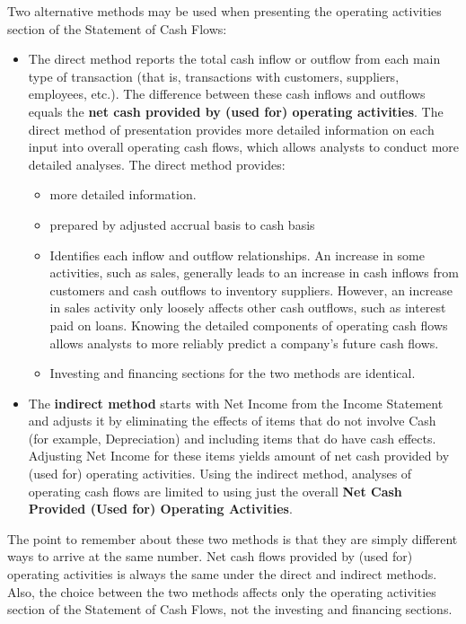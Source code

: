 \documentclass[../main.tex]{subfiles}
\begin{document}
	Two alternative methods may be used when presenting the operating 
	activities section of the Statement of Cash Flows:
	\begin{itemize}[noitemsep]
		\item The direct method reports the total cash inflow or outflow from 
		each main type of transaction (that is, transactions with customers, 
		suppliers, employees, etc.). The difference between these cash inflows 
		and outflows equals the \textbf{net cash provided by (used for) 
		operating activities}. The direct method of presentation provides more 
		detailed information on each input into overall operating cash flows, 
		which allows analysts to conduct more detailed analyses.  The direct 
		method provides:
		\begin{itemize}[noitemsep]
			\item more detailed information. 
			\item prepared by adjusted accrual basis to cash basis
			\item Identifies each inflow and outflow relationships. An increase 
			in some activities, such as sales, generally leads to an increase 
			in cash inflows from customers and cash outflows to inventory 
			suppliers. However, an increase in sales activity only loosely 
			affects other cash outflows, such as interest paid on loans. 
			Knowing the detailed components of operating cash flows allows 
			analysts to more reliably predict a company’s future cash flows.
			\item Investing and financing sections for the two methods are 
			identical.
		\end{itemize}
		\item The \textbf{indirect method} starts with Net Income from the 
		Income Statement and adjusts it by eliminating the effects of items 
		that do not involve Cash (for example, Depreciation) and including 
		items that do have cash effects. Adjusting Net Income for these items 
		yields amount of net cash provided by (used for) operating activities. 
		Using the indirect method, analyses of operating cash flows are limited 
		to using just the overall \textbf{Net Cash Provided (Used for) 
		Operating Activities}.
	\end{itemize}
	The point to remember about these two methods is that they are simply 
	different ways to arrive at the same number. Net cash flows provided by 
	(used for) operating activities is always the same under the direct and 
	indirect methods. Also, the choice between the two methods affects only the 
	operating activities section of the Statement of Cash Flows, not the 
	investing and financing sections.
	
\end{document}
